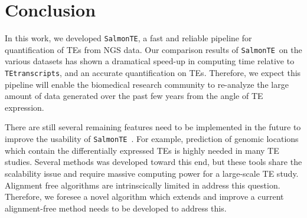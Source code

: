 \documentclass{ws-procs11x85}
\newcommand{\TEtranscripts}{\texttt{TEtranscripts}}
\newcommand{\SalmonTE}{\texttt{SalmonTE}}
\begin{document}
\section{Conclusion}


In this work, we  developed \SalmonTE, a fast and reliable pipeline for quantification of TEs from 
NGS data.
Our comparison results of \SalmonTE~on the various datasets has shown a dramatical speed-up in computing time relative to \TEtranscripts, 
and
an accurate quantification on TEs. 
Therefore, we expect this pipeline will enable the biomedical research community to re-analyze the large amount of data generated over the past few years from the angle of TE expression. 

There are still several remaining features need to be implemented in the future to improve the usability of \SalmonTE~. 
For example, prediction of genomic locations which 
contain the differentially expressed TEs is highly needed in many TE studies. Several methods was developed toward this end\cite{de2017identifying,criscione2014transcriptional}, but these tools share the scalability issue and require
massive computing power for a large-scale TE study. 
Alignment free algorithms are intrinscically limited in address this 
question. 
Therefore, we foresee a novel algorithm which extends and improve a current alignment-free method needs to be developed to address this.



\end{document}
